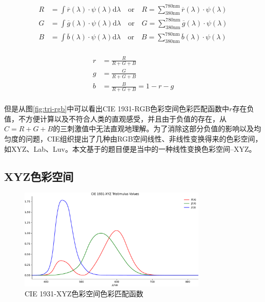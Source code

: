 \begin{equation}
    \begin{aligned}
        R & =\int \overline{r}(\lambda)\cdot\psi(\lambda)\text{d}\lambda \quad\text{or}\quad R = \sum_{380\text{nm}}^{780\text{nm}} \overline{r}(\lambda)\cdot\psi(\lambda)\\
        G & =\int \overline{g}(\lambda)\cdot\psi(\lambda)\text{d}\lambda \quad\text{or}\quad G = \sum_{380\text{nm}}^{780\text{nm}} \overline{g}(\lambda)\cdot\psi(\lambda)\\
        B & =\int \overline{b}(\lambda)\cdot\psi(\lambda)\text{d}\lambda \quad\text{or}\quad B = \sum_{380\text{nm}}^{780\text{nm}} \overline{b}(\lambda)\cdot\psi(\lambda)\\
    \end{aligned}
    \label{eq:tri-rgb}
\end{equation}

\begin{equation}
    \begin{aligned}
        r & =\frac{R}{R+G+B}\\
        g & =\frac{G}{R+G+B}\\
        b & =\frac{B}{R+G+B} = 1-r-g\\
    \end{aligned}
    \label{eq:tri-rgb-n}
\end{equation}

但是从图\ref{fig:tri-rgb}中可以看出CIE 1931-RGB色彩空间色彩匹配函数中$r$存在负值，不方便计算以及不符合人类的直观感受，并且由于负值的存在，从$C=R+G+B$的三刺激值中无法直观地理解。为了消除这部分负值的影响以及均匀度的问题，CIE组织提出了几种由RGB空间线性、非线性变换得来的色彩空间，如XYZ、Lab、Luv。本文基于的题目便是当中的一种线性变换色彩空间--XYZ。

\subsection{XYZ色彩空间}

\begin{figure}[htbp]
    \centering
    \includegraphics[width=0.8\textwidth]{./imgs/sec1/xyz-1931.pdf}
    \caption{CIE 1931-XYZ色彩空间色彩匹配函数}
    \label{fig:tri-xyz}
 \end{figure}

